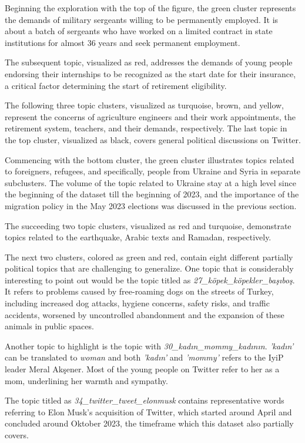 Beginning the exploration with the top of the figure, the green cluster represents the demands of military 
sergeants willing to be permanently employed. It is about a batch of sergeants who have worked on a limited contract
in state institutions for almost 36 years and seek permanent employment.

The subsequent topic, visualized as red, addresses the demands of young people endorsing their 
internships to be recognized as the start date for their insurance, a critical factor determining 
the start of retirement eligibility.

The following three topic clusters, visualized as turquoise, brown, and yellow, represent the concerns of 
agriculture engineers and their work appointments, the retirement system, teachers, and their 
demands, respectively. The last topic in the top cluster, visualized as black, covers general political discussions on 
Twitter.

Commencing with the bottom cluster, the green cluster illustrates topics related to foreigners, 
refugees, and specifically, people from Ukraine and Syria in separate subclusters. 
The volume of the topic related to Ukraine stay at a high level since the beginning of the 
dataset till the beginning of 2023, and the importance of the migration policy in the May 2023 
elections was discussed in the previous section. 

The succeeding two topic clusters, visualized as red and turquoise, demonstrate topics related to 
the earthquake, Arabic texts and Ramadan, respectively. 

The next two clusters, colored as green and red, contain eight different partially political 
topics that are challenging to generalize. One topic that is considerably interesting to point 
out would be the topic titled as \textit{27\_köpek\_köpekler\_başıboş}. It refers to problems 
caused by free-roaming dogs on the streets of Turkey, including increased dog attacks, hygiene 
concerns, safety risks, and traffic accidents, worsened by uncontrolled abandonment and the 
expansion of these animals in public spaces. 

Another topic to highlight is the topic with \textit{30\_kadın\_mommy\_kadının}. \textit{'kadın'} 
can be translated to \textit{woman} and both \textit{'kadın'} and \textit{'mommy'} refers to the 
\ac{IyiP} leader Meral Akşener. Most of the young people on Twitter refer to her as a mom, 
underlining her warmth and sympathy.

The topic titled as \textit{34\_twitter\_tweet\_elonmusk} contains representative words 
referring to Elon Musk's acquisition of Twitter, which started around April and concluded 
around Oktober 2023, the timeframe which this dataset also partially covers.

